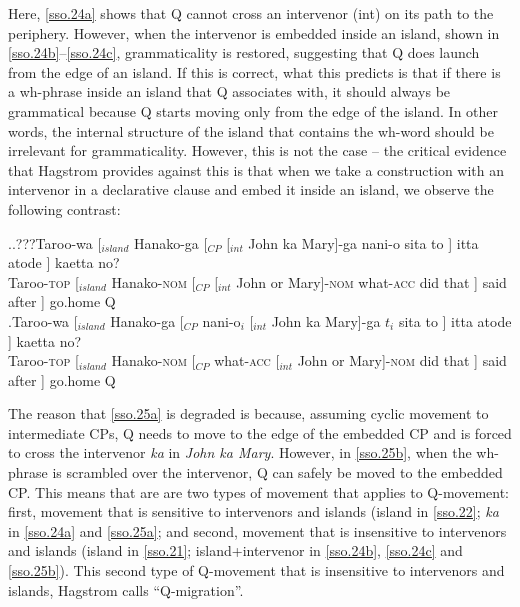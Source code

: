 \documentclass[charis]{glossa}
\begin{document}
Here, \ref{sso.24a} shows that Q cannot cross an intervenor (int) on its path to the periphery. However, when the intervenor is embedded inside an island, shown in \ref{sso.24b}--\ref{sso.24c}, grammaticality is restored, suggesting that Q does launch from the edge of an island. If this is correct, what this predicts is that if there is a wh-phrase inside an island that Q associates with, it should always be grammatical because Q starts moving only from the edge of the island. In other words, the internal structure of the island that contains the wh-word should be irrelevant for grammaticality. However, this is not the case -- the critical evidence that Hagstrom provides against this is that when we take a construction with an intervenor in a declarative clause and embed it inside an island, we observe the following contrast:

\ex.\ag.???\label{sso.25a}Taroo-wa [$_{island}$ Hanako-ga [$_{CP}$ [$_{int}$ John ka Mary]-ga nani-o sita to ] itta atode ] kaetta no?\\
   Taroo-\textsc{top} [$_{island}$ Hanako-\textsc{nom} [$_{CP}$ [$_{int}$ John or Mary]-\textsc{nom} what-\textsc{acc} did that ] said after ] go.home Q\\
   \bg.\label{sso.25b}Taroo-wa [$_{island}$ Hanako-ga [$_{CP}$ nani-o$_i$ [$_{int}$ John ka Mary]-ga $t_i$ sita to ] itta atode ] kaetta no?\\
   Taroo-\textsc{top} [$_{island}$ Hanako-\textsc{nom} [$_{CP}$ what-\textsc{acc} [$_{int}$ John or Mary]-\textsc{nom} {} did that ] said after ] go.home Q\\

The reason that \ref{sso.25a} is degraded is because, assuming cyclic movement to intermediate CPs, Q needs to move to the edge of the embedded CP and is forced to cross the intervenor \textit{ka} in \textit{John ka Mary}. However, in \ref{sso.25b}, when the wh-phrase is scrambled over the intervenor, Q can safely be moved to the embedded CP. This means that are are two types of movement that applies to Q-movement: first, movement that is sensitive to intervenors and islands (island in \ref{sso.22}; \textit{ka} in \ref{sso.24a} and \ref{sso.25a}; and second, movement that is insensitive to intervenors and islands (island in \ref{sso.21}; island+intervenor in \ref{sso.24b}, \ref{sso.24c} and \ref{sso.25b}). This second type of Q-movement that is insensitive to intervenors and islands, Hagstrom calls ``Q-migration''.
\end{document}
